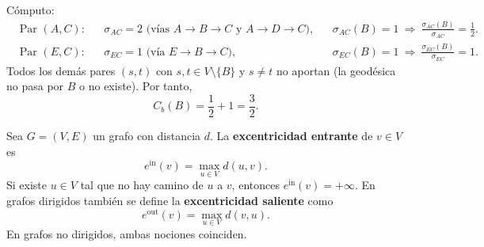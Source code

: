 \begin{ejemplo}[Centralidad de intermediación de $v=B$]
                Cómputo:
                \[
                \begin{aligned}
                &\text{Par }(A,C): && \sigma_{AC}=2 \text{ (vías } A\!\to\!B\!\to\!C \text{ y } A\!\to\!D\!\to\!C),
                && \sigma_{AC}(B)=1 \ \Rightarrow\ \frac{\sigma_{AC}(B)}{\sigma_{AC}}=\tfrac{1}{2}.\\
                &\text{Par }(E,C): && \sigma_{EC}=1 \text{ (vía } E\!\to\!B\!\to\!C),
                && \sigma_{EC}(B)=1 \ \Rightarrow\ \frac{\sigma_{EC}(B)}{\sigma_{EC}}=1.
                \end{aligned}
                \]
                Todos los demás pares $(s,t)$ con $s,t\in V\setminus\{B\}$ y $s\neq t$ no aportan (la geodésica no pasa por $B$ o no existe). Por tanto,
                \[
                C_b(B)=\frac{1}{2}+1=\frac{3}{2}.
                \]
            \end{ejemplo}

            \begin{definicion}[Excentricidad]
                Sea $G=(V,E)$ un grafo con distancia $d$. La \textbf{excentricidad entrante} de $v\in V$ es
                \[
                e^{\mathrm{in}}(v)=\max_{u\in V}d(u,v).
                \]
                Si existe $u\in V$ tal que no hay camino de $u$ a $v$, entonces $e^{\mathrm{in}}(v)=+\infty$. En grafos dirigidos también se define la \textbf{excentricidad saliente} como
                \[
                e^{\mathrm{out}}(v)=\max_{u\in V}d(v,u).
                \]
                En grafos no dirigidos, ambas nociones coinciden.
            \end{definicion}

